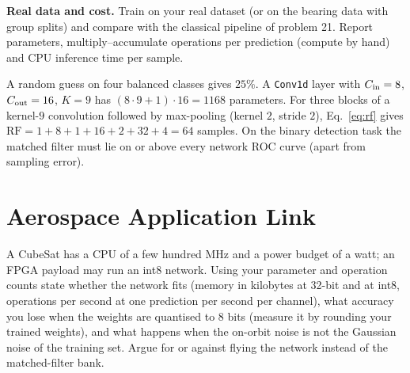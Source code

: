 \documentclass[11pt,a4paper]{article}
\begin{document}
\begin{tasks}
  \item \textbf{Real data and cost.} Train on your real dataset (or on the bearing data with group splits) and compare with the classical pipeline of problem 21. Report parameters, multiply--accumulate operations per prediction (compute by hand) and CPU inference time per sample.
\end{tasks}

\begin{checkpoint}
A random guess on four balanced classes gives $25\%$. A \texttt{Conv1d} layer with $C_{\rm in}=8$, $C_{\rm out}=16$, $K=9$ has $(8\cdot9+1)\cdot16=1168$ parameters. For three blocks of a kernel-$9$ convolution followed by max-pooling (kernel $2$, stride $2$), Eq.~\eqref{eq:rf} gives $\mathrm{RF}=1+8+1+16+2+32+4=64$ samples. On the binary detection task the matched filter must lie on or above every network ROC curve (apart from sampling error).
\end{checkpoint}

\section*{Aerospace Application Link}
A CubeSat has a CPU of a few hundred MHz and a power budget of a watt; an FPGA payload may run an int8 network. Using your parameter and operation counts state whether the network fits (memory in kilobytes at 32-bit and at int8, operations per second at one prediction per second per channel), what accuracy you lose when the weights are quantised to 8 bits (measure it by rounding your trained weights), and what happens when the on-orbit noise is not the Gaussian noise of the training set. Argue for or against flying the network instead of the matched-filter bank.
\end{document}
